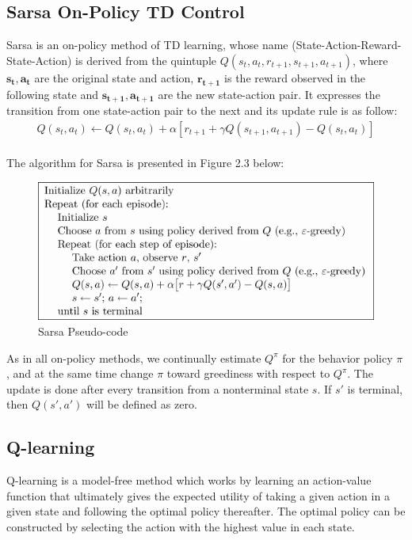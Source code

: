 \documentclass[paper=a4, fontsize=11pt]{scrartcl}
\numberwithin{equation}{section}		%
\numberwithin{figure}{section}			%
\numberwithin{table}{section}				%
\begin{document}
\subsection*{Sarsa On-Policy TD Control}
Sarsa is an on-policy method of TD learning, whose name (State-Action-Reward-State-Action) is derived from the quintuple $Q(s_t, a_t, r_{t+1}, s_{t+1}, a_{t+1})$, where  $\mathbf{s_t, a_t}$ are the original state and action, $\mathbf{r_{t+1}}$ is the reward observed in the following state and $\mathbf{s_{t+1}, a_{t+1}}$ are the new state-action pair. It expresses the transition from one state-action pair to the next and its update rule is as follow:
\begin{align}
Q(s_t, a_t) \gets Q(s_t, a_t)+\alpha[r_{t+1}+\gamma Q(s_{t+1}, a_{t+1})-Q(s_t, a_t)]
\end{align}\\
The algorithm for Sarsa is presented in Figure 2.3 below:
\begin{figure}[H] \centering
\includegraphics[scale=0.6]{sarsa_algorithm.png}
\caption{Sarsa Pseudo-code} \label{figure:Sarsa}
\end{figure}
As in all on-policy methods, we continually estimate $Q^\pi$ for the behavior policy $\pi$, and at the same time change $\pi$ toward greediness with respect to $Q^\pi$. The update is done after every transition from a nonterminal state $s$. If $s'$ is terminal, then $Q(s',a')$ will be defined as zero. \\


\subsection{\textbf {Q-learning}}
Q-learning is a model-free method which works by learning an action-value function that ultimately gives the expected utility of taking a given action in a given state and following the optimal policy thereafter.  The optimal policy can be constructed by selecting the action with the highest value in each state.
\end{document}
